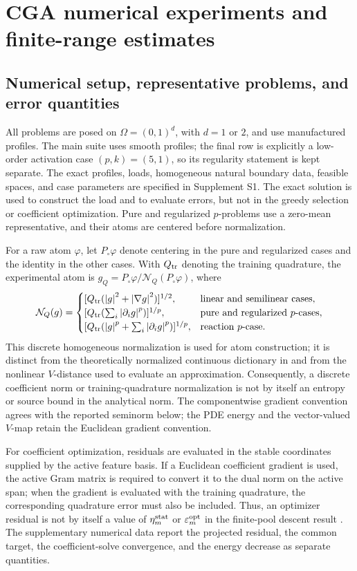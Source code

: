 \section{CGA numerical experiments and finite-range estimates}
\label{sec:numerics}

\subsection{Numerical setup, representative problems, and error quantities}

All problems are posed on \(\Omega=(0,1)^d\), with \(d=1\) or \(2\), and use manufactured
profiles. The main suite uses smooth profiles; the final row is explicitly a low-order activation
case \((p,k)=(5,1)\), so its regularity statement is kept separate. The exact profiles, loads, homogeneous natural boundary data, feasible spaces, and
case parameters are specified in Supplement S1. The exact solution is
used to construct the load and to evaluate errors, but not in the greedy selection or coefficient
optimization. Pure and regularized \(p\)-problems use a zero-mean representative, and their atoms are
centered before normalization.

For a raw atom \(\varphi\), let \(P_\circ\varphi\) denote centering in the pure and regularized cases and
the identity in the other cases. With \(Q_{\rm tr}\) denoting the training quadrature, the experimental
atom is \(g_Q=P_\circ\varphi/\mathcal N_Q(P_\circ\varphi)\), where
\[
 \mathcal N_Q(g)=
 \begin{cases}
 [Q_{\rm tr}(\abs g^2+\abs{\nabla g}^2)]^{1/2},&\text{linear and semilinear cases},\\
 [Q_{\rm tr}(\sum_i\abs{\partial_i g}^p)]^{1/p},&\text{pure and regularized \(p\)-cases},\\
 [Q_{\rm tr}(\abs g^p+\sum_i\abs{\partial_i g}^p)]^{1/p},&\text{reaction \(p\)-case}.
 \end{cases}
\]
This discrete homogeneous normalization is used for atom construction; it is distinct from the
theoretically normalized continuous dictionary in  and from the nonlinear
\(V\)-distance used to evaluate an approximation. Consequently, a discrete coefficient norm or
training-quadrature normalization is not by itself an entropy or source bound in the analytical norm.
The componentwise gradient convention agrees with the reported seminorm below;
the PDE energy and the vector-valued \(V\)-map retain the Euclidean gradient convention.

For coefficient optimization, residuals are evaluated in the stable coordinates supplied
by the active feature basis. If a Euclidean coefficient gradient is used, the active
Gram matrix is required to convert it to the dual norm on the active span; when the
gradient is evaluated with the training quadrature, the corresponding quadrature error
must also be included. Thus, an optimizer residual is not by itself a value of
$\eta_m^{\rm stat}$ or $\varepsilon_m^{\rm opt}$ in the finite-pool descent result
. The
supplementary numerical data report the projected residual, the common target, the
coefficient-solve convergence, and the energy decrease as separate quantities.

